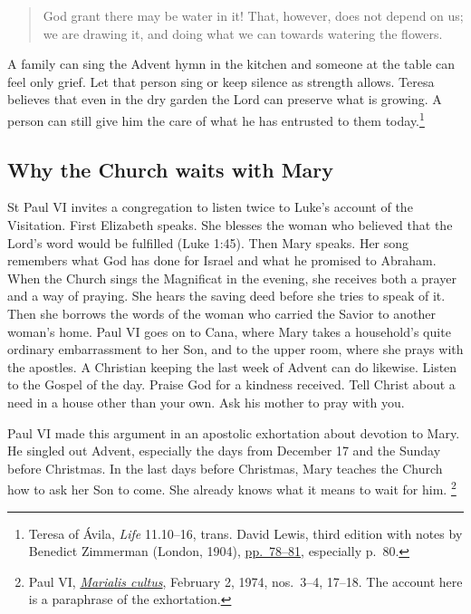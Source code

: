 \begin{quote}
God grant there may be water in it! That, however, does not depend on us;
we are drawing it, and doing what we can towards watering the flowers.
\end{quote}

A family can sing the Advent hymn in the kitchen and someone at the table
can feel only grief. Let that person sing or keep silence as strength
allows. Teresa believes that even in the dry garden the Lord can preserve
what is growing. A person can still give him the care of what he has
entrusted to them today.\footnote{Teresa of Ávila, \emph{Life} 11.10--16,
trans. David Lewis, third edition with notes by Benedict Zimmerman (London,
1904), \href{https://archive.org/details/lifeofteresajesu00tereuoft/page/78/mode/2up}{pp.~78--81},
especially p.~80.}

\subsection{Why the Church waits with Mary}

St Paul VI invites a congregation to listen twice to Luke's account of
the Visitation. First Elizabeth speaks. She blesses the woman who believed
that the Lord's word would be fulfilled (Luke 1:45). Then Mary speaks.
Her song remembers what God has done for Israel and what he promised to
Abraham. When the Church sings the Magnificat in the evening, she receives
both a prayer and a way of praying. She hears the saving deed before she
tries to speak of it. Then she borrows the words of the woman who carried
the Savior to another woman's home. Paul VI goes on to Cana, where Mary
takes a household's quite ordinary embarrassment to her Son, and to the
upper room, where she prays with the apostles. A Christian keeping the last
week of Advent can do likewise. Listen to the Gospel of the day. Praise
God for a kindness received. Tell Christ about a need in a house other
than your own. Ask his mother to pray with you.

Paul VI made this argument in an apostolic exhortation about devotion to
Mary. He singled out Advent, especially the days from December 17 and the
Sunday before Christmas. In the last days before Christmas, Mary teaches the Church how to ask her
Son to come. She already knows what it means to wait for him.
\footnote{Paul VI,
\href{https://www.vatican.va/content/paul-vi/en/apost_exhortations/documents/hf_p-vi_exh_19740202_marialis-cultus.html}{\emph{Marialis cultus}},
February 2, 1974, nos.~3--4, 17--18. The account here is a paraphrase
of the exhortation.}


